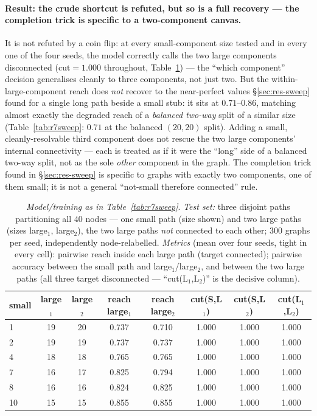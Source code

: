 \documentclass[11pt,a4paper]{article}
\begin{document}
\paragraph{Result: the crude shortcut is refuted, but so is a full recovery ---
the completion trick is specific to a two-component canvas.} It is not refuted
by a coin flip: at every small-component size tested and in every one of the
four seeds, the model correctly calls the two large components disconnected
($\mathrm{cut}=1.000$ throughout, Table~\ref{tab:r7threeway}) --- the ``which
component'' decision generalises cleanly to three components, not just two.
But the within-large-component reach does \emph{not} recover to the
near-perfect values \S\ref{sec:res-sweep} found for a single long path beside a
small stub: it sits at $0.71$--$0.86$, matching almost exactly the degraded
reach of a \emph{balanced two-way} split of a similar size (Table~\ref{tab:r7sweep}:
$0.71$ at the balanced $(20,20)$ split). Adding a small, cleanly-resolvable
third component does not rescue the two large components' internal
connectivity --- each is treated as if it were the ``long'' side of a balanced
two-way split, not as the sole \emph{other} component in the graph. The
completion trick found in \S\ref{sec:res-sweep} is specific to graphs with
exactly two components, one of them small; it is not a general ``not-small
therefore connected'' rule.

\begin{table}[H]\centering\small
\begin{tabular}{lccccccc}
\toprule
small & large$_1$ & large$_2$ & reach large$_1$ & reach large$_2$ & cut(S,L$_1$) & cut(S,L$_2$) & cut(L$_1$,L$_2$)\\
\midrule
1  & 19 & 20 & 0.737 & 0.710 & 1.000 & 1.000 & 1.000\\
2  & 19 & 19 & 0.737 & 0.737 & 1.000 & 1.000 & 1.000\\
4  & 18 & 18 & 0.765 & 0.765 & 1.000 & 1.000 & 1.000\\
7  & 16 & 17 & 0.825 & 0.794 & 1.000 & 1.000 & 1.000\\
8  & 16 & 16 & 0.824 & 0.825 & 1.000 & 1.000 & 1.000\\
10 & 15 & 15 & 0.855 & 0.855 & 1.000 & 1.000 & 1.000\\
\bottomrule\end{tabular}
\caption{\emph{Model/training as in Table~\ref{tab:r7sweep}}. \emph{Test set:}
three disjoint paths partitioning all $40$ nodes --- one small path (size shown)
and two large paths (sizes large$_1$, large$_2$), the two large paths
\emph{not} connected to each other; $300$ graphs per seed, independently
node-relabelled. \emph{Metrics} (mean over four seeds, tight in every cell):
pairwise reach inside each large path (target connected); pairwise accuracy
between the small path and large$_1$/large$_2$, and between the two large
paths (all three target disconnected --- ``cut(L$_1$,L$_2$)'' is the decisive
column).}
\label{tab:r7threeway}
\end{table}
\end{document}

